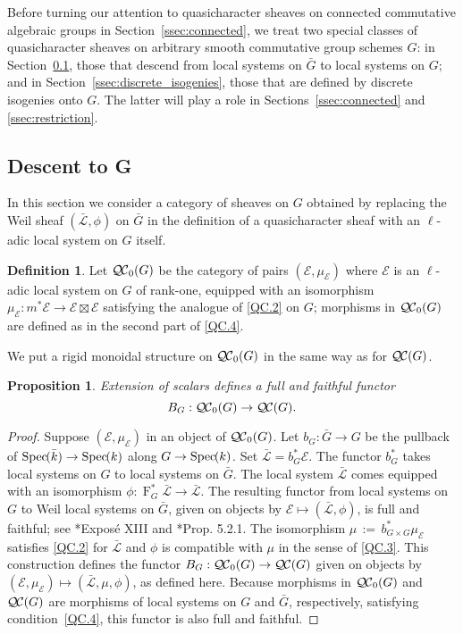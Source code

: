 \documentclass[CM,Submssn,SecEq]{degruyter-crelle} %
\theoremstyle{plain}
\newtheorem{proposition}[theorem]{Proposition}
\theoremstyle{definition}
\newtheorem{definition}[theorem]{Definition}
\theoremstyle{remark}
\newcommand{\bFq}{\bar{k}}
\newcommand{\Fq}{k}
\newcommand{\Frob}[1]{\operatorname{F}_{#1}}
\newcommand{\Spec}[1]{{\operatorname{Spec}\hskip-1pt( #1 )}}
\newcommand{\ceq}{{\, :=\, }}
\newcommand{\qcs}[1]{{\mathcal{#1}}}
\newcommand{\gqcs}[1]{{\mathcal{\bar #1}}}
\newcommand{\QC}{{\mathcal{Q\hskip-0.8pt C}}}
\newcommand{\bQC}{{\QC_0}}
\newcommand{\bG}{\bar{G}}
\begin{document}
Before turning our attention to quasicharacter sheaves on connected commutative algebraic groups in Section~\ref{ssec:connected}, we treat two special classes of quasicharacter sheaves on arbitrary smooth commutative group schemes $G$:  in Section~\ref{ssec:descentG}, those that descend from local systems on $\bG$ to local systems on $G$; and in Section~\ref{ssec:discrete_isogenies}, those that are defined by discrete isogenies onto $G$. The latter will play a role in Sections~\ref{ssec:connected} and \ref{ssec:restriction}.

\subsection{Descent to G}\label{ssec:descentG}

In this section we consider a category of sheaves on $G$ obtained by
replacing the Weil sheaf $(\gqcs{L}, \phi)$ on $\bG$ in the definition of a quasicharacter sheaf with an $\ell$-adic local system on $G$ itself.

\begin{definition}
Let $\bQC(G)$ be the category of pairs $(\qcs{E},\mu_\qcs{E})$
where $\qcs{E}$ is an $\ell$-adic local system on $G$ of rank-one,
equipped with an isomorphism $\mu_\qcs{E} : m^* \qcs{E} \to \qcs{E} \boxtimes \qcs{E}$
satisfying the analogue of \ref{QC.2} on $G$;
morphisms in $\bQC(G)$ are defined as in the second part of
\ref{QC.4}.
\end{definition}

We put a rigid monoidal structure on $\bQC(G)$ in the same way as for $\QC(G)$.

\begin{proposition}\label{prop:BG}
Extension of scalars defines a full and faithful functor
\[
B_G : \bQC(G) \to \QC(G).
\]
\end{proposition}

\begin{proof}
 Suppose $(\qcs{E},\mu_\qcs{E})$ in an object of $\bQC(G)$.
 Let $b_G : {\bar G} \to G$ be the pullback of $\Spec{\bFq} \to \Spec{\Fq}$ along $G\to \Spec{\Fq}$.
 Set $\gqcs{L} = b_G^* \qcs{E}$. 
 The functor $b_G^*$ takes local systems on $G$ to local systems on $\bG$.
 The local system $\gqcs{L}$ comes equipped with an isomorphism
 $\phi: \Frob{G}^* \gqcs{L} \to \gqcs{L}$.
 The resulting functor from local systems on $G$ to Weil local systems on $\bG$, given on objects by $\qcs{E} \mapsto (\gqcs{L},\phi)$, 
 is full and faithful; see \cite{deligne-katz:SGA7.2}*{Expos\'e XIII} and \cite{beilinson-bernstein-deligne:81a}*{Prop. 5.2.1}.
 The isomorphism $\mu \ceq b_{G\times G}^*\mu_\qcs{E}$ satisfies \ref{QC.2}
 for $\gqcs{L}$ and $\phi$ is compatible with $\mu$ in the sense of \ref{QC.3}.
 This construction defines the functor $B_G : \bQC(G) \to \QC(G)$ given on objects by $(\qcs{E},\mu_\qcs{E}) \mapsto (\gqcs{L},\mu, \phi)$, as defined here. 
 Because morphisms in $\bQC(G)$ and $\QC(G)$ are morphisms of local systems on $G$ and $\bG$, respectively, satisfying condition~\ref{QC.4}, this functor is also full and faithful.
\end{proof}
\end{document}

